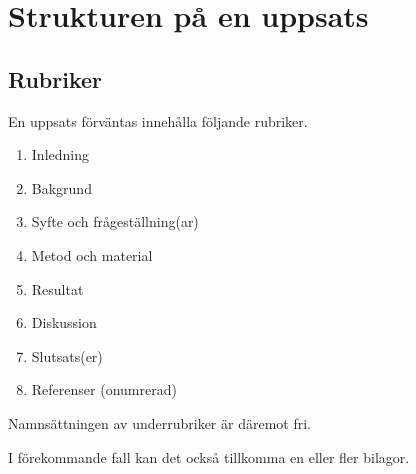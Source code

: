 
\section{Strukturen på en uppsats}
\label{struktur}

\subsection{Rubriker}
\label{rubriker}

En uppsats förväntas innehålla följande rubriker.

\begin{enumerate}
\item Inledning
\item Bakgrund
\item Syfte och frågeställning(ar)
\item Metod och material
\item Resultat
\item Diskussion
\item Slutsats(er)
\item Referenser (onumrerad)
\end{enumerate}

\noindent Namnsättningen av underrubriker är däremot fri.

I förekommande fall kan det också tillkomma en eller fler bilagor.

